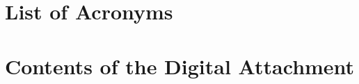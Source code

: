 \documentclass[thesis=M,english]{template/FITthesis}[2019/12/23]
\begin{document}



\begin{conclusion}
	\label{part:conclusion}
	
\end{conclusion}


\begin{sloppypar}
	\printbibliography
\end{sloppypar}


\appendix


\chapter{List of Acronyms}
\label{part:list_of_acronyms}




\chapter{Contents of the Digital Attachment}
\label{part:contents_of_the_digital_attachment}



\end{document}
